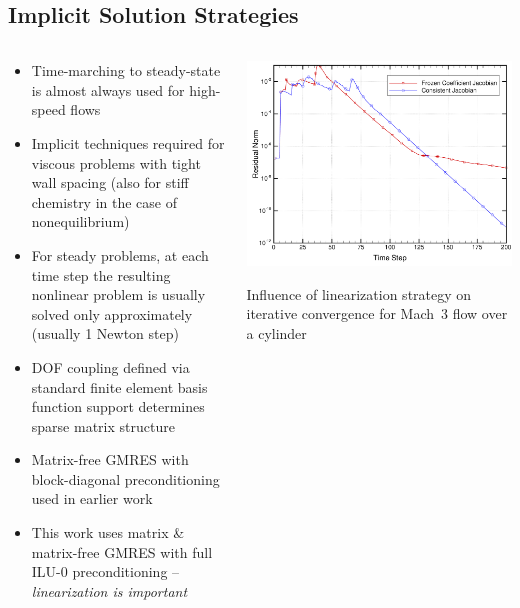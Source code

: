 \documentclass[compress,11pt]{beamer}
\begin{document}
\subsection{Implicit Solution Strategies}
\frame
{
  \vspace{-1.5em}
  \begin{columns}[t]
    \begin{block}{}
      \footnotesize
      \begin{itemize}
        \item Time-marching to steady-state is almost always used for high-speed flows
	\item Implicit techniques required for viscous problems with tight wall spacing (also for stiff chemistry in the case of nonequilibrium)
	\item For steady problems, at each time step the resulting nonlinear problem is usually solved only approximately (usually 1 Newton step)
	\item DOF coupling defined via standard finite element basis function support determines sparse matrix structure
	\item Matrix-free GMRES with block-diagonal preconditioning used in earlier work~\cite{skaliabadi_dissertation}
	\item This work uses matrix \& matrix-free GMRES with full ILU-0 preconditioning -- \emph{linearization is important}
      \end{itemize}
    \end{block}
    \begin{block}{}
      \tiny
      \begin{center}
	\includegraphics[width=\textwidth]{figures/convergence}

	Influence of linearization strategy on iterative convergence for Mach~3 flow over a cylinder
      \end{center}
    \end{block}
  \end{columns}
}
\end{document}
